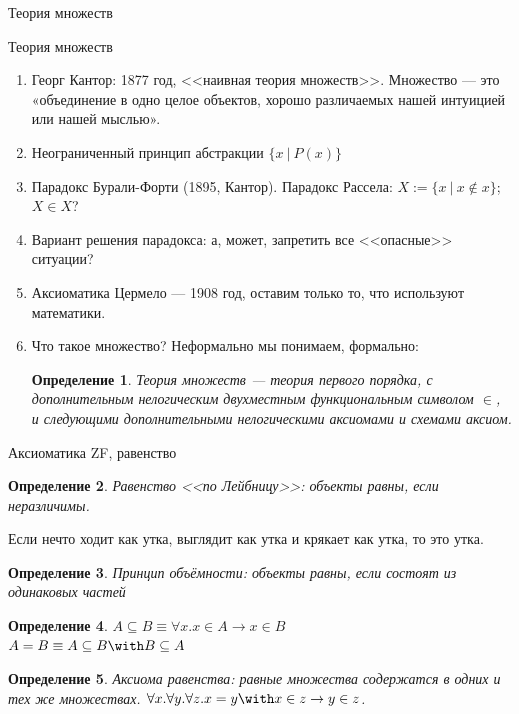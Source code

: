 \documentclass[aspectratio=169]{beamer}
\newtheorem{dfn}{Определение}[section]
\begin{document}
\newcommand\doubleplus{+\kern-1.3ex+\kern0.8ex}
\newcommand\mdoubleplus{\ensuremath{\mathbin{+\mkern-10mu+}}}

\begin{frame}{}
\LARGE\begin{center}Теория множеств\end{center}
\end{frame}

\begin{frame}{Теория множеств}
\begin{enumerate}
\item Георг Кантор: 1877 год, <<наивная теория множеств>>. Множество --- это «объединение в одно
целое объектов, хорошо различаемых нашей интуицией или нашей мыслью».\pause
\item Неограниченный принцип абстракции $\{ x\ |\ P(x)\}$ \pause
\item Парадокс Бурали-Форти (1895, Кантор). Парадокс Рассела: $X := \{ x\ |\ x \notin x\}$; $X\in X$?\pause
\item Вариант решения парадокса: а, может, запретить все <<опасные>> ситуации? \pause
\item Аксиоматика Цермело --- 1908 год, оставим только то, что используют математики. \pause
\item Что такое множество? Неформально мы понимаем, формально:\pause

\begin{dfn} Теория множеств --- теория первого порядка,
с дополнительным нелогическим двухместным функциональным символом $\in$, и следующими 
дополнительными нелогическими аксиомами и схемами аксиом.
\end{dfn}
\end{enumerate}
\end{frame}

\begin{frame}{Аксиоматика ZF, равенство}
\begin{dfn} Равенство <<по Лейбницу>>: объекты равны, если неразличимы.\end{dfn} Если нечто ходит как утка, выглядит как 
утка и крякает как утка, то это утка.\pause
\begin{dfn} Принцип объёмности: объекты равны, если состоят из одинаковых частей\end{dfn}\pause

\begin{dfn} $A \subseteq B \equiv \forall x.x \in A \rightarrow x \in B$ \\\pause
 $A = B \equiv A \subseteq B \with B \subseteq A$ \end{dfn}\pause
\begin{dfn} Аксиома равенства: равные множества содержатся в одних и тех же множествах. 
$\forall x. \forall y. \forall z. x = y \with x \in z \rightarrow y \in z$.
\end{dfn}
\end{frame}
\end{document}
